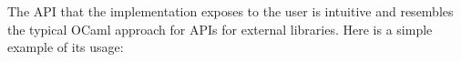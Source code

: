 \documentclass[12pt,twoside,notitlepage]{report}
\begin{document}
The API that the implementation exposes to the user is intuitive and resembles the typical OCaml approach for APIs for external libraries. Here is a simple example of its usage:
\begin{comment}
module IntRevision = Make(struct
    type t = int
    let merge head parent current = head + current - parent
  end)

let () =
  let r = IntRevision.init () in
  let res1 = IntRevision.create r 0 in
  let revision = IntRevision.get_revision res1 
   and account = IntRevision.get_isolated res1 in
     Deferred.both 
      (IntRevision.fork revision 
        (fun r -> 
          return (IntRevision.write r account 
                    ((IntRevision.read r account) + 5)))
      (IntRevision.fork revision 
        (fun r -> 
          return (IntRevision.write r account 
                    ((IntRevision.read r account) + 10)))
     >>|(fun (rev1, rev2 ->
        let join_rev1 = IntRevision.join revision rev1 in
        let join_rev2 = Intrevision.join join_rev1 rev2 in
          assert(IntRevision.read join_rev2 = 15)    
\end{comment}
\end{document}
